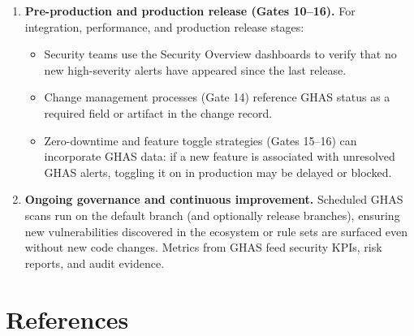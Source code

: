 \documentclass[11pt]{article}
\begin{document}
\begin{enumerate}[leftmargin=*]
  \item \textbf{Pre-production and production release (Gates 10--16).}
  For integration, performance, and production release stages:
  \begin{itemize}
    \item Security teams use the Security Overview dashboards to verify that no new high-severity alerts have appeared since the last release.
    \item Change management processes (Gate 14) reference GHAS status as a required field or artifact in the change record.
    \item Zero-downtime and feature toggle strategies (Gates 15--16) can incorporate GHAS data: if a new feature is associated with unresolved GHAS alerts, toggling it on in production may be delayed or blocked.
  \end{itemize}

  \item \textbf{Ongoing governance and continuous improvement.}
  Scheduled GHAS scans run on the default branch (and optionally release branches), ensuring new vulnerabilities discovered in the ecosystem or rule sets are surfaced even without new code changes. Metrics from GHAS feed security KPIs, risk reports, and audit evidence.
\end{enumerate}

\section*{References}
\end{document}
